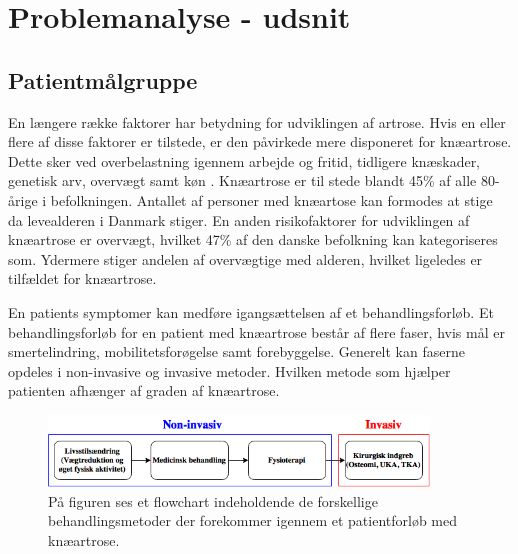 \chapter{Problemanalyse - udsnit}\vspace{-.75cm}
\section{Patientmålgruppe}
En længere række faktorer har betydning for udviklingen af artrose. Hvis en eller flere af disse faktorer er tilstede, er den påvirkede mere disponeret for knæartrose. Dette sker ved overbelastning igennem arbejde og fritid, tidligere knæskader, genetisk arv, overvægt samt køn \citep{brostrom2012}. Knæartrose er til stede blandt 45\% af alle 80-årige i befolkningen. Antallet af personer med knæartose kan formodes at stige da levealderen i Danmark stiger. %
En anden risikofaktorer for udviklingen af knæartrose er overvægt, hvilket 47\% af den danske befolkning kan kategoriseres som. Ydermere stiger andelen af overvægtige med alderen, hvilket ligeledes er tilfældet for knæartrose. \citep{Vestergaard2014} \citep{Vestergaard2016} \citep{Lind2016} \citep{Lind2016b} 

En patients symptomer kan medføre igangsættelsen af et behandlingsforløb. Et behandlingsforløb for en patient med knæartrose består af flere faser, hvis mål er smertelindring, mobilitetsforøgelse samt forebyggelse. Generelt kan faserne opdeles i non-invasive og invasive metoder. Hvilken metode som hjælper patienten afhænger af graden af knæartrose.

\begin{figure}[H]
	\centering
	\includegraphics[width=0.9\textwidth]{../figures/bProblemanalyse/flowchart_behandlingsforloeb.png}
	\caption{På figuren ses et flowchart indeholdende de forskellige behandlingsmetoder der forekommer igennem et patientforløb med knæartrose.}
	\label{fig:flow_behandlingsfaser}
\end{figure}\vspace{-.25cm}

